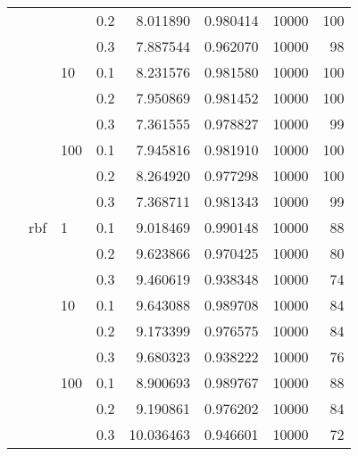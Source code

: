 \begin{table}[H]
\begin{tabular}{llllrrrr}
           &     &     & 0.2 &   8.011890 &  0.980414 &   10000 &   100 \\
           &     &     & 0.3 &   7.887544 &  0.962070 &   10000 &    98 \\
           &     & 10  & 0.1 &   8.231576 &  0.981580 &   10000 &   100 \\
           &     &     & 0.2 &   7.950869 &  0.981452 &   10000 &   100 \\
           &     &     & 0.3 &   7.361555 &  0.978827 &   10000 &    99 \\
           &     & 100 & 0.1 &   7.945816 &  0.981910 &   10000 &   100 \\
           &     &     & 0.2 &   8.264920 &  0.977298 &   10000 &   100 \\
           &     &     & 0.3 &   7.368711 &  0.981343 &   10000 &    99 \\
           & rbf & 1   & 0.1 &   9.018469 &  0.990148 &   10000 &    88 \\
           &     &     & 0.2 &   9.623866 &  0.970425 &   10000 &    80 \\
           &     &     & 0.3 &   9.460619 &  0.938348 &   10000 &    74 \\
           &     & 10  & 0.1 &   9.643088 &  0.989708 &   10000 &    84 \\
           &     &     & 0.2 &   9.173399 &  0.976575 &   10000 &    84 \\
           &     &     & 0.3 &   9.680323 &  0.938222 &   10000 &    76 \\
           &     & 100 & 0.1 &   8.900693 &  0.989767 &   10000 &    88 \\
           &     &     & 0.2 &   9.190861 &  0.976202 &   10000 &    84 \\
           &     &     & 0.3 &  10.036463 &  0.946601 &   10000 &    72 \\
\bottomrule
\end{tabular}
\end{table}
